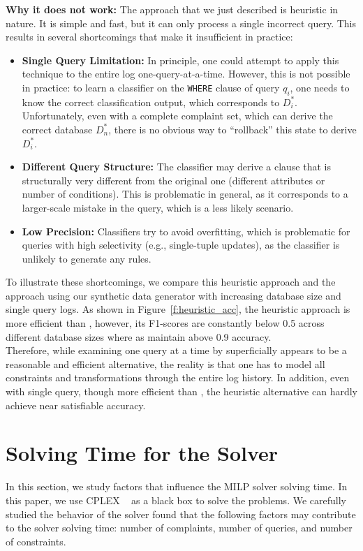 \smallskip
\noindent
\textbf{Why it does not work:}
The approach that we just described is heuristic in nature. It
is simple and fast, but it can only process a single incorrect query.
This results in several shortcomings that make it insufficient in
practice:
\begin{itemize}[itemsep=1pt, leftmargin=5mm]
    
\item \textbf{Single Query Limitation: }
In principle, one could attempt to apply this technique to the
entire log one-query-at-a-time. However, this is not possible in
practice: to learn a classifier on the \texttt{WHERE} clause of query
$q_i$, one needs to know the correct classification output, which
corresponds to $D_i^*$. Unfortunately, even with a complete complaint
set, which can derive the correct database $D_n^*$, there is no
obvious way to ``rollback'' this state to derive $D_i^*$.

\item \textbf{Different Query Structure: } 
The classifier may derive a clause that is structurally very
different from the original one (different attributes or number of
conditions). This is problematic in general, as it corresponds to a
larger-scale mistake in the query, which is a less likely scenario.

\item \textbf{Low Precision: }
Classifiers try to avoid overfitting, which is problematic for
queries with high selectivity (e.g., single-tuple updates), as the
classifier is unlikely to generate any rules.
\end{itemize}

To illustrate these shortcomings, we compare this heuristic approach and the \sys approach
using our synthetic data generator with increasing database size 
and single query logs. As shown in Figure~\ref{f:heuristic_acc}, the heuristic approach
is more efficient than \sys, however, its
F1-scores are constantly below 0.5 across
different database sizes where as \sys maintain above 0.9 accuracy. \\
Therefore, while examining one query at a time by  
superficially appears
to be a reasonable and efficient alternative, 
the reality is that one
has to model all constraints and transformations through the entire
log history. In addition, even with single query, though more efficient than \sys, 
the heuristic alternative can hardly achieve near satisfiable accuracy. 
  

\section{Solving Time for the Solver}
\label{app:solvtime}
In this section, we study factors that influence the MILP solver solving time. In this paper, we
use CPLEX ~\cite{cplex2014v12} as a black box to solve the problems. We carefully studied
the behavior of the solver found that the following factors may contribute to the solver 
solving time: number of complaints, number of queries, and number of constraints. \\

